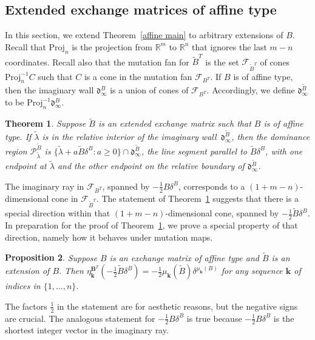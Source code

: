 \documentclass[10pt]{article}
\newtheorem{proposition}{Proposition}[section]
\newtheorem{theorem}[proposition]{Theorem}
\theoremstyle{definition}
\theoremstyle{remark}
\numberwithin{equation}{section}
\newcommand{\reals}{\mathbb R}
\newcommand{\set}[1]{{\lbrace #1 \rbrace}}
\newcommand{\F}{{\mathcal F}}
\newcommand{\0}{{\mathbf{0}}}
\newcommand{\Proj}{\mathrm{Proj}}
\newcommand{\kk}{{\boldsymbol{k}}}
\newcommand{\tB}{{\widetilde{B}}}
\newcommand{\BB}{\mathbf{B}}
\renewcommand{\P}{\mathcal{P}}
\renewcommand{\d}{{\mathfrak d}}
\begin{document}
\subsection{Extended exchange matrices of affine type}
In this section, we extend Theorem~\ref{affine main} to arbitrary extensions of $B$.  
Recall that $\Proj_n$ is the projection from $\reals^m$ to $\reals^n$ that ignores the last $m-n$ coordinates.
Recall also that the mutation fan for $\tB^T$ is the set $\F_{\tB^T}$ of cones $\Proj_n^{-1}C$ such that $C$ is a cone in the mutation fan $\F_{B^T}$.
If $B$ is of affine type, then the imaginary wall $\d_\infty^B$ is a union of cones of $\F_{B^T}$.
Accordingly, we define $\d_\infty^\tB$ to be $\Proj_n^{-1}\d_\infty^B$.

\begin{theorem}\label{affine main extended}
Suppose $\tB$ is an extended exchange matrix such that $B$ is of affine type.
  If $\tilde\lambda$ is in the relative interior of the imaginary wall~$\d^\tB_\infty$, then the dominance region $\P^\tB_{\tilde\lambda}$ is $\set{\tilde\lambda+a\tB\delta^B:a\ge0}\cap\d^\tB_\infty$, the line segment parallel to $\tB\delta^B$, with one endpoint at $\tilde\lambda$ and the other endpoint on the relative boundary of $\d^\tB_\infty$.
\end{theorem}

The imaginary ray in $\F_{B^T}$, spanned by $-\frac12B\delta^B$, corresponds to a $(1+m-n)$-dimensional cone in $\F_{\tB^T}$.
The statement of Theorem~\ref{affine main extended} suggests that there is a special direction within that $(1+m-n)$-dimensional cone, spanned by $-\frac12\tB\delta^B$.
In preparation for the proof of Theorem~\ref{affine main extended}, we prove a special property of that direction, namely how it behaves under mutation maps.

\begin{proposition}\label{delta is the tilde man}
Suppose $B$ is an exchange matrix of affine type and $\tB$ is an extension of $B$.
Then $\eta^{\BB^T}_\kk(-\frac12\tB\delta^B)=-\frac12\mu_\kk(\tB)\delta^{\mu_\kk(B)}$ for any sequence $\kk$ of indices in $\set{1,\ldots,n}$.
\end{proposition}
The factors $\frac12$ in the statement are for aesthetic reasons, but the negative signs are crucial.
The analogous statement for $-\frac12B\delta^B$ is true because $-\frac12B\delta^B$ is the shortest integer vector in the imaginary ray.
\end{document}
